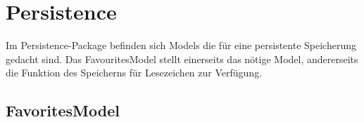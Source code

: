 
\section{Persistence}

Im Persistence-Package befinden sich Models die für eine persistente Speicherung gedacht sind. Das FavouritesModel stellt einerseits das nötige Model, andererseits die Funktion des Speicherns für Lesezeichen zur Verfügung.

\subsection{FavoritesModel}


